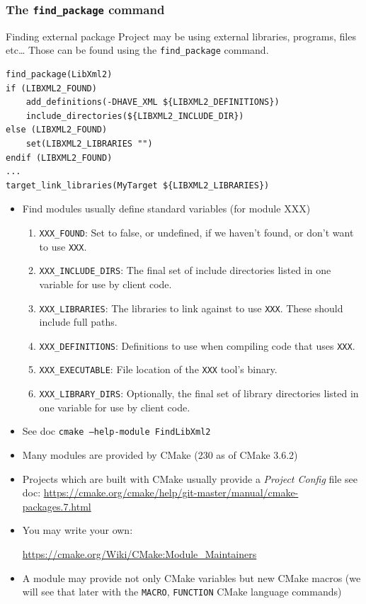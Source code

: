 \documentclass[compress,slidestop,table,usepdftitle=false
              ]
               {beamer}
\newcommand{\fname}[1]{\texttt{#1}}
\begin{document}
\begin{frame}
\frametitle{The \lstinline!find_package! command}
\begin{block}{Finding external package}
Project may be using external libraries, programs, files etc\ldots
Those can be found using the \lstinline!find_package! command.
\end{block}
\begin{lstlisting}[basicstyle=\scriptsize,caption=using libxml2]
find_package(LibXml2)
if (LIBXML2_FOUND)
    add_definitions(-DHAVE_XML ${LIBXML2_DEFINITIONS})
    include_directories(${LIBXML2_INCLUDE_DIR})
else (LIBXML2_FOUND)
    set(LIBXML2_LIBRARIES "")
endif (LIBXML2_FOUND)
...
target_link_libraries(MyTarget ${LIBXML2_LIBRARIES})
\end{lstlisting}
\begin{itemize}
\item Find modules usually define standard variables (for module XXX)
     \begin{enumerate}
     \item \fname{XXX\_FOUND}: Set to false, or undefined, if we haven't found, or don't want to use \fname{XXX}.
     \item \fname{XXX\_INCLUDE\_DIRS}: The final set of include directories listed in one variable for use by client code.
     \item \fname{XXX\_LIBRARIES}: The libraries to link against to use \fname{XXX}.
           These should include full paths.
     \item \fname{XXX\_DEFINITIONS}: Definitions to use when compiling code that uses \fname{XXX}.
     \item \fname{XXX\_EXECUTABLE}: File location of the \fname{XXX} tool's binary.
     \item \fname{XXX\_LIBRARY\_DIRS}: Optionally, the final set of library directories listed in one variable for use by client code.
     \end{enumerate}
\item See doc \fname{cmake --help-module FindLibXml2}
\item Many modules are provided by CMake (230 as of CMake 3.6.2)
\item Projects which are built with CMake usually provide a \emph{Project Config} file
      see doc: \url{https://cmake.org/cmake/help/git-master/manual/cmake-packages.7.html}
\item You may write your own:

      \url{https://cmake.org/Wiki/CMake:Module_Maintainers}
\item A module may provide not only CMake variables but new CMake macros
      (we will see that later with the \lstinline!MACRO!, \lstinline!FUNCTION!
       CMake language commands)
\end{itemize}
\end{frame}
\end{document}
